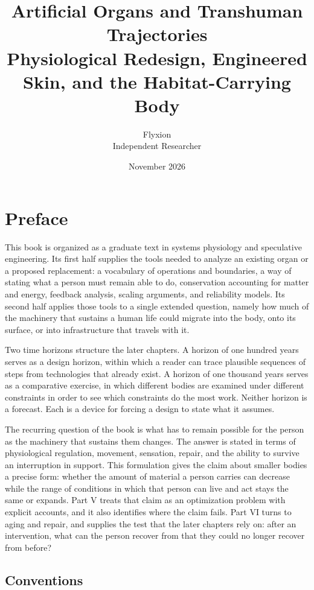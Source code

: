 \documentclass[11pt,openany]{book}
\title{\textbf{Artificial Organs and Transhuman Trajectories}\\[0.6em]
\Large Physiological Redesign, Engineered Skin, and the Habitat-Carrying Body}
\author{Flyxion\\ \small Independent Researcher}
\date{November 2026}
\theoremstyle{definition}
\theoremstyle{remark}
\begin{document}
\frontmatter
\maketitle

\chapter*{Preface}

This book is organized as a graduate text in systems physiology and speculative engineering. Its first half supplies the tools needed to analyze an existing organ or a proposed replacement: a vocabulary of operations and boundaries, a way of stating what a person must remain able to do, conservation accounting for matter and energy, feedback analysis, scaling arguments, and reliability models. Its second half applies those tools to a single extended question, namely how much of the machinery that sustains a human life could migrate into the body, onto its surface, or into infrastructure that travels with it.

Two time horizons structure the later chapters. A horizon of one hundred years serves as a design horizon, within which a reader can trace plausible sequences of steps from technologies that already exist. A horizon of one thousand years serves as a comparative exercise, in which different bodies are examined under different constraints in order to see which constraints do the most work. Neither horizon is a forecast. Each is a device for forcing a design to state what it assumes.

The recurring question of the book is what has to remain possible for the person as the machinery that sustains them changes. The answer is stated in terms of physiological regulation, movement, sensation, repair, and the ability to survive an interruption in support. This formulation gives the claim about smaller bodies a precise form: whether the amount of material a person carries can decrease while the range of conditions in which that person can live and act stays the same or expands. Part V treats that claim as an optimization problem with explicit accounts, and it also identifies where the claim fails. Part VI turns to aging and repair, and supplies the test that the later chapters rely on: after an intervention, what can the person recover from that they could no longer recover from before?

\section*{Conventions}
\end{document}
